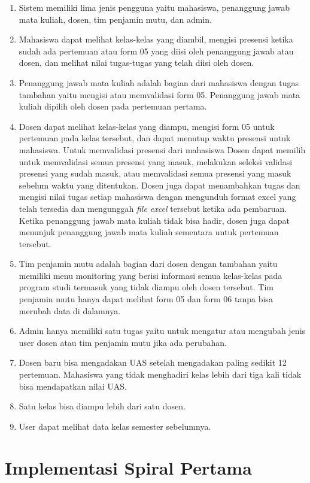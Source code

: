 \begin{enumerate}
	\item Sistem memiliki lima jenis pengguna yaitu mahasiswa, penanggung jawab mata kuliah, dosen, tim penjamin mutu, dan admin.
	\item Mahasiswa dapat melihat kelas-kelas yang diambil, mengisi presensi ketika sudah ada pertemuan atau form 05 yang diisi oleh penanggung jawab atau dosen, dan melihat nilai tugas-tugas yang telah diisi oleh dosen.
	\item Penanggung jawab mata kuliah adalah bagian dari mahasiswa dengan tugas tambahan yaitu  mengisi atau memvalidasi form 05. Penanggung jawab mata kuliah dipilih oleh dosen pada pertemuan pertama.
	\item Dosen dapat melihat kelas-kelas yang diampu, mengisi form 05 untuk pertemuan pada kelas tersebut, dan dapat menutup waktu presensi untuk mahasiswa. Untuk memvalidasi presensi dari mahasiswa Dosen dapat memilih untuk memvalidasi semua presensi yang masuk, melakukan seleksi validasi presensi yang sudah masuk, atau memvalidasi semua presensi yang masuk sebelum waktu yang ditentukan.  Dosen juga dapat menambahkan tugas dan mengisi nilai tugas setiap mahasiswa dengan mengunduh format excel yang telah tersedia dan mengunggah \textit{file excel} tersebut ketika ada pembaruan. Ketika penanggung jawab mata kuliah tidak bisa hadir, dosen juga dapat menunjuk penanggung jawab mata kuliah sementara untuk pertemuan tersebut.
	\item Tim penjamin mutu adalah bagian dari dosen dengan tambahan yaitu memiliki menu monitoring yang berisi informasi semua kelas-kelas pada program studi termasuk yang tidak diampu oleh dosen tersebut. Tim penjamin mutu hanya dapat melihat form 05 dan form 06 tanpa bisa merubah data di dalamnya.
	\item Admin hanya memiliki satu tugas yaitu untuk mengatur atau mengubah jenis user dosen atau tim penjamin mutu jika ada perubahan.
	\item Dosen baru bisa mengadakan UAS setelah mengadakan paling sedikit 12 pertemuan. Mahasiswa yang tidak menghadiri kelas lebih dari tiga kali tidak bisa mendapatkan nilai UAS.
	\item Satu kelas bisa diampu lebih dari satu dosen.
	\item User dapat melihat data kelas semester sebelumnya.
	
\end{enumerate}


\section{Implementasi Spiral Pertama}

